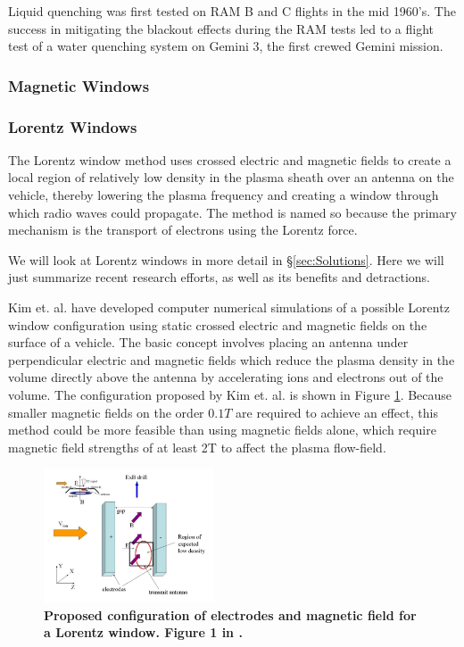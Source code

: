 \documentclass[twocolumn]{article}
\begin{document}
			Liquid quenching was first tested on RAM B and C flights in the mid 1960's. \cite{rybak_causes_1970}
			The success in mitigating the blackout effects during the RAM tests led to a flight test of a water quenching system on Gemini 3, the first crewed Gemini mission.
		
		\subsubsection*{Magnetic Windows}
		
		
		\subsubsection*{Lorentz Windows}
			The Lorentz window method uses crossed electric and magnetic fields to create a local region of relatively low density in the plasma sheath over an antenna on the vehicle, thereby lowering the plasma frequency and creating a window through which radio waves could propagate.
			The method is named so because the primary mechanism is the transport of electrons using the Lorentz force.
			
			We will look at Lorentz windows in more detail in \S\ref{sec:Solutions}.
			Here we will just summarize recent research efforts, as well as its benefits and detractions.
			
			Kim et. al. have developed computer numerical simulations of a possible Lorentz window configuration using static crossed electric and magnetic fields on the surface of a vehicle.\cite{kim_plasma_2007}\cite{kim_analysis_2008}\cite{kim_modeling_2010}
			The basic concept involves placing an antenna under perpendicular electric and magnetic fields which reduce the plasma density in the volume directly above the antenna by accelerating ions and electrons out of the volume.
			The configuration proposed by Kim et. al. is shown in Figure \ref{fig:KimExBConfig}.
			Because smaller magnetic fields on the order $0.1 T$ are required to achieve an effect, this method could be more feasible than using magnetic fields alone, which require magnetic field strengths of at least 2T to affect the plasma flow-field.\cite{otsu_feasibility_2006}
		
			\begin{figure}[H]
				\centering
					\includegraphics[width=0.45\textwidth]{Images/Kimetal_ExB_config.png}
				\caption{\textbf{Proposed configuration of electrodes and magnetic field for a Lorentz window. Figure 1 in \cite{kim_plasma_2007}.}}
				\label{fig:KimExBConfig}
			\end{figure}
		
\end{document}

